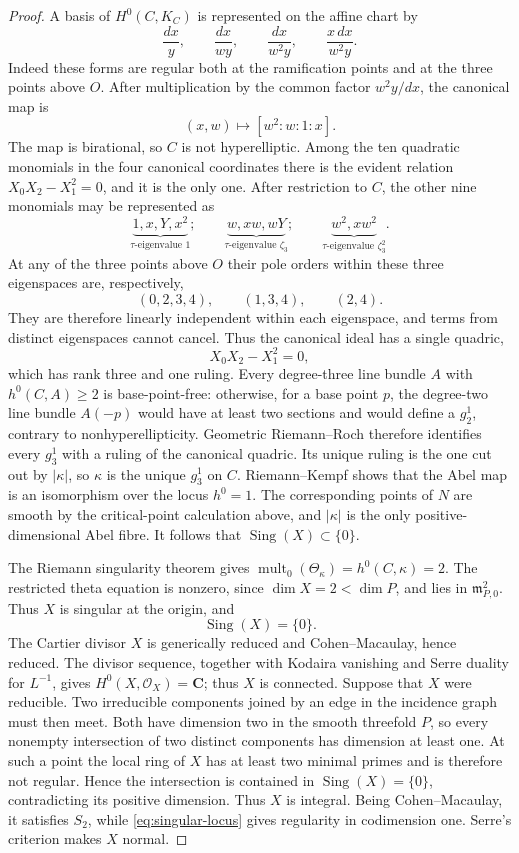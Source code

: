 \documentclass[10pt]{amsart}
\numberwithin{equation}{section}
\theoremstyle{definition}
\theoremstyle{remark}
\newcommand{\CC}{\mathbf C}
\newcommand{\Sing}{\operatorname{Sing}}
\begin{document}
\begin{proof}
A basis of $H^0(C,K_C)$ is represented on the affine chart by
\[
 \frac{dx}{y},\qquad
 \frac{dx}{wy},\qquad
 \frac{dx}{w^2y},\qquad
 \frac{x\,dx}{w^2y}.
\]
Indeed these forms are regular both at the ramification points and at the
three points above $O$.  After multiplication by the common factor
$w^2y/dx$, the canonical map is
\[
 (x,w)\longmapsto[w^2:w:1:x].
\]
The map is birational, so $C$ is not hyperelliptic.  Among the ten
quadratic monomials in the four canonical coordinates there is the evident
relation $X_0X_2-X_1^2=0$, and it is the only one.  After restriction to
$C$, the other nine monomials may be represented as
\[
 \underbrace{1,x,Y,x^2}_{\tau\text{-eigenvalue }1};\qquad
 \underbrace{w,xw,wY}_{\tau\text{-eigenvalue }\zeta_3};\qquad
 \underbrace{w^2,xw^2}_{\tau\text{-eigenvalue }\zeta_3^2}.
\]
At any of the three points above $O$ their pole orders within these three
eigenspaces are, respectively,
\[
 (0,2,3,4),\qquad (1,3,4),\qquad (2,4).
\]
They are therefore linearly independent within each eigenspace, and terms
from distinct eigenspaces cannot cancel.  Thus the canonical ideal has a
single quadric,
\[
 X_0X_2-X_1^2=0,
\]
which has rank three and one ruling.  Every degree-three line bundle $A$
with $h^0(C,A)\ge2$ is base-point-free: otherwise, for a base point $p$,
the degree-two line bundle $A(-p)$ would have at least two sections and
would define a $g^1_2$, contrary to nonhyperellipticity.  Geometric
Riemann--Roch therefore identifies every $g^1_3$ with a ruling of the
canonical quadric.  Its unique ruling is the one cut out by $|\kappa|$, so
$\kappa$ is the unique $g^1_3$ on $C$.
Riemann--Kempf \cite{Kempf1973} shows that the Abel map is an isomorphism
over the locus $h^0=1$.  The corresponding points of $N$ are smooth by the
critical-point calculation above, and $|\kappa|$ is the only
positive-dimensional Abel fibre.  It follows that
$\Sing(X)\subset\{0\}$.

The Riemann singularity theorem \cite{Kempf1973} gives
$\operatorname{mult}_0(\Theta_\kappa)=h^0(C,\kappa)=2$.  The restricted
theta equation is nonzero, since $\dim X=2<\dim P$, and lies in
$\mathfrak m_{P,0}^2$.  Thus $X$ is singular at the origin, and
\begin{equation}
 \Sing(X)=\{0\}.
\label{eq:singular-locus}
\end{equation}
The Cartier divisor $X$ is generically reduced and Cohen--Macaulay, hence
reduced.  The divisor sequence, together with Kodaira vanishing and Serre
duality for $L^{-1}$, gives $H^0(X,\mathcal O_X)=\CC$; thus $X$ is
connected.  Suppose that $X$ were
reducible.  Two irreducible components joined by an edge in the incidence
graph must then meet.  Both have dimension two in the smooth threefold $P$,
so every nonempty intersection of two distinct components has dimension at
least one.  At such a point the local ring of $X$ has at least two minimal
primes and is therefore not regular.  Hence the intersection is contained in
$\Sing(X)=\{0\}$, contradicting its positive dimension.  Thus $X$ is
integral.  Being Cohen--Macaulay, it satisfies $S_2$, while
\eqref{eq:singular-locus} gives regularity in codimension one.  Serre's
criterion makes $X$ normal.


\end{proof}
\end{document}
